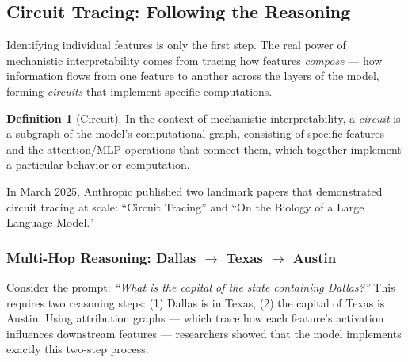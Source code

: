\documentclass[11pt, a4paper]{article}
\theoremstyle{definition}
\newtheorem{definition}{Definition}[section]
\theoremstyle{plain}
\begin{document}
\subsection{Circuit Tracing: Following the Reasoning}
\label{sec:circuits}

Identifying individual features is only the first step.  The real power of
mechanistic interpretability comes from tracing how features \emph{compose}
--- how information flows from one feature to another across the layers of
the model, forming \emph{circuits} that implement specific computations.

\begin{definition}[Circuit]
In the context of mechanistic interpretability, a \emph{circuit} is a
subgraph of the model's computational graph, consisting of specific
features and the attention/MLP operations that connect them, which together
implement a particular behavior or computation.
\end{definition}

In March 2025, Anthropic published two landmark papers that demonstrated
circuit tracing at scale: ``Circuit Tracing'' and ``On the Biology of a
Large Language Model.''

\subsubsection{Multi-Hop Reasoning: Dallas $\to$ Texas $\to$ Austin}

Consider the prompt: \emph{``What is the capital of the state containing
Dallas?''}  This requires two reasoning steps: (1) Dallas is in Texas,
(2) the capital of Texas is Austin.  Using attribution graphs --- which
trace how each feature's activation influences downstream features ---
researchers showed that the model implements exactly this two-step
process:

\begin{center}
\end{center}
\end{document}
